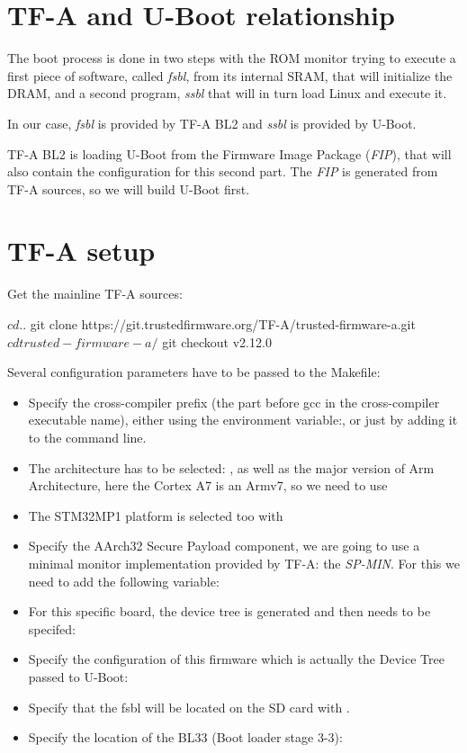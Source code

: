 
\section{TF-A and U-Boot relationship}

The boot process is done in two steps with the ROM monitor trying to
execute a first piece of software, called {\em fsbl}, from its
internal SRAM, that will initialize the DRAM, and a second program,
{\em ssbl} that will in turn load Linux and execute it.

In our case, {\em fsbl} is provided by TF-A BL2 and {\em ssbl}
is provided by U-Boot.

TF-A BL2 is loading U-Boot from the Firmware Image Package ({\em FIP}),
that will also contain the configuration for this second part.
The {\em FIP} is generated from TF-A sources, so we will build U-Boot
first.

\section{TF-A setup}

Get the mainline TF-A sources:

\begin{bashinput}
$ cd ..
$ git clone https://git.trustedfirmware.org/TF-A/trusted-firmware-a.git
$ cd trusted-firmware-a/
$ git checkout v2.12.0
\end{bashinput}

Several configuration parameters have to be passed to the Makefile:
\begin{itemize}
\item Specify the cross-compiler prefix (the part before gcc in the
      cross-compiler executable name), either using the environment
      variable:, or just by
      adding it to the  command line.
\item The architecture has to be selected: , as
      well as the major version of Arm Architecture, here the Cortex A7 is
      an Armv7, so we need to use 
\item The STM32MP1 platform is selected too with 
\item Specify the AArch32 Secure Payload component, we are going to
      use a minimal monitor implementation provided by TF-A: the
      {\em SP-MIN}. For this we need to add the following variable:
\item For this specific board, the device tree is generated and then
      needs to be specifed: 
\item Specify the configuration of this firmware which is actually
      the Device Tree passed to U-Boot:
\item Specify that the fsbl will be located on the SD
      card with .
\item Specify the location of the BL33 (Boot loader stage 3-3):
\end{itemize}

